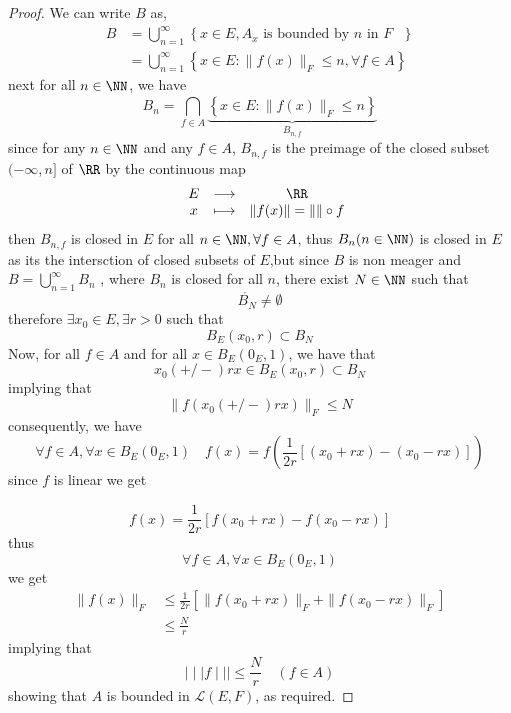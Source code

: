 \begin{proof}
We can write $B $ as, 
\begin{align*}
	B &= \bigcup_{n=1}^{\infty }  
	\left\{ x \in E, 
	A_{x} \text{ is bounded by $n $ in $F $ } \right\} \\
	  &= 
	  \bigcup_{n=1}^{\infty } 
	  \left\{ x \in E: \| f(x)  \| _{F} \leq n, 
	  \forall f \in  A\right\} 
\end{align*}
next for all $n \in \NN $, we have 
\[
B_{n} = \bigcap_{f \in  A}^{}  
\underbrace{
\left\{ x \in  E: \| f(x)  \| _{F} \leq n \right\}
}_{B_{n,f}} 
\]
since for any $n \in \NN$  and 
any $f \in  A $, $B_{n,f} $  is the preimage of the 
closed subset $(-\infty ,n]  $  of $\RR  $  by the 
continuous map
\[
\begin{array}{cccc}
        &  E  & \longrightarrow & \RR  \\

           &  x  & \longmapsto     & 
	   \| f(x)  \| = \|   \| \circ  f\\ 
\end{array}
\]
then $B_{n,f} $ is closed in $E $ for all
$n \in \NN, \forall f \in A$, thus 
$B_{n}(n \in \NN)  $  is closed in $E $ 
as its the intersction of closed subsets 
of $E $,but since $B $ is non meager and 
$B = \bigcup_{n=1}^{\infty } B_{n}  $ , where 
$B_{n} $ is closed for all $n $, there exist
$N \in \NN $  such that 
\[
\mathring{B_{N}} \neq \emptyset 
\]
therefore $\exists x_0 \in  E, 
\exists r > 0$  such that 
\[
B_{E}(x_0, r)  \subset B_{N}
\]
Now, for all $f \in  A $ and for all 
$x \in  B_{E}(0_{E},1)  $, we have that 
\[
x_0 (+/-) rx \in B_{E}(x_0,r) \subset B_{N} 
\]
implying that 
\[
\| f(x_0 (+/-) rx )  \| _{F} \leq N
\]
consequently, we have 
\[
\forall f \in  A, \forall x \in  B_{E}(0_{E},1)
\quad 
f(x) = f \left( \frac{1}{2r}[(x_0 +rx) - (x_0-rx) ] \right) 
\]
since $f $ is linear we get 

\[
f(x) = \frac{1}{2r} \left[ 
	f(x_0 + rx)  - f(x_0 -rx) 
\right]
\]
thus \[
\forall  f \in  A, \forall  x \in B_{E}(0_{E},1) 
\]
we get 
\begin{align*}
	\| f(x)  \| _{F} & \leq 
	\frac{1}{2r}
	\left[ \| f(x_0+rx)  \| _{F} + 
	\| f(x_0-rx)  \| _{F}\right] \\
			 & \leq  \frac{N}{r}
\end{align*}
implying that 
\[
\mid \mid \mid  f \mid \mid \mid \leq  \frac{N}{r}
\quad  ( f \in A) 
\]
showing that $A $ is bounded in $\mathcal{L} (E,F)  $,
as required.

\end{proof}


